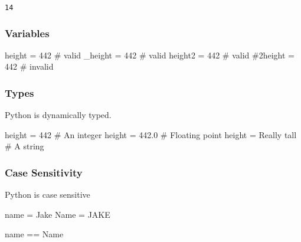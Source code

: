\documentclass[
  letterpaper,
  DIV=11,
  numbers=noendperiod]{scrreprt}
\newenvironment{Shaded}{\begin{snugshade}}{\end{snugshade}}
\newcommand{\CommentTok}[1]{\textcolor[rgb]{0.37,0.37,0.37}{#1}}
\newcommand{\DecValTok}[1]{\textcolor[rgb]{0.68,0.00,0.00}{#1}}
\newcommand{\FloatTok}[1]{\textcolor[rgb]{0.68,0.00,0.00}{#1}}
\newcommand{\NormalTok}[1]{\textcolor[rgb]{0.00,0.46,0.62}{#1}}
\newcommand{\OperatorTok}[1]{\textcolor[rgb]{0.37,0.37,0.37}{#1}}
\newcommand{\StringTok}[1]{\textcolor[rgb]{0.13,0.47,0.30}{#1}}
\begin{document}
\begin{verbatim}
14
\end{verbatim}

\hypertarget{variables}{%
\subsubsection{Variables}\label{variables}}

\begin{Shaded}
\begin{Highlighting}[]
\NormalTok{height }\OperatorTok{=} \DecValTok{442} \CommentTok{\# valid}
\NormalTok{\_height }\OperatorTok{=} \DecValTok{442} \CommentTok{\# valid}
\NormalTok{height2 }\OperatorTok{=} \DecValTok{442} \CommentTok{\# valid}
\CommentTok{\#2height = 442 \# invalid}
\end{Highlighting}
\end{Shaded}

\hypertarget{types}{%
\subsubsection{Types}\label{types}}

Python is dynamically typed.

\begin{Shaded}
\begin{Highlighting}[]
\NormalTok{height }\OperatorTok{=} \DecValTok{442}           \CommentTok{\# An integer}
\NormalTok{height }\OperatorTok{=} \FloatTok{442.0}         \CommentTok{\# Floating point}
\NormalTok{height }\OperatorTok{=} \StringTok{\textquotesingle{}Really tall\textquotesingle{}} \CommentTok{\# A string}
\end{Highlighting}
\end{Shaded}

\hypertarget{case-sensitivity}{%
\subsubsection{Case Sensitivity}\label{case-sensitivity}}

Python is case sensitive

\begin{Shaded}
\begin{Highlighting}[]
\NormalTok{name }\OperatorTok{=} \StringTok{\textquotesingle{}Jake\textquotesingle{}}
\NormalTok{Name }\OperatorTok{=} \StringTok{\textquotesingle{}JAKE\textquotesingle{}}

\NormalTok{name }\OperatorTok{==}\NormalTok{ Name}
\end{Highlighting}
\end{Shaded}
\end{document}

